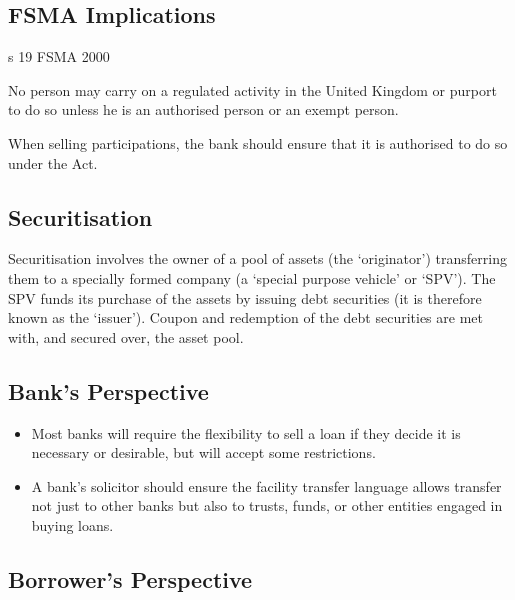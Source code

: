 \documentclass[
]{article}
\providecommand{\tightlist}{%
  \setlength{\itemsep}{0pt}\setlength{\parskip}{0pt}}
\newenvironment{env-794f47f9-38df-4a52-b7f1-227d11939e2b}
{
    \savenotes\tcolorbox[blanker,breakable,left=5pt,borderline west={2pt}{-4pt}{green}]
}
{
    \endtcolorbox\spewnotes
}
\begin{document}
\hypertarget{fsma-implications}{%
\subsection{FSMA Implications}\label{fsma-implications}}

\begin{env-794f47f9-38df-4a52-b7f1-227d11939e2b}

s 19 FSMA 2000

No person may carry on a regulated activity in the United Kingdom or
purport to do so unless he is an authorised person or an exempt person.

\end{env-794f47f9-38df-4a52-b7f1-227d11939e2b}

When selling participations, the bank should ensure that it is
authorised to do so under the Act.

\hypertarget{securitisation}{%
\subsection{Securitisation}\label{securitisation}}

Securitisation involves the owner of a pool of assets (the `originator')
transferring them to a specially formed company (a `special purpose
vehicle' or `SPV'). The SPV funds its purchase of the assets by issuing
debt securities (it is therefore known as the `issuer'). Coupon and
redemption of the debt securities are met with, and secured over, the
asset pool.

\hypertarget{banks-perspective-3}{%
\subsection{Bank's Perspective}\label{banks-perspective-3}}

\begin{itemize}
\tightlist
\item
  Most banks will require the flexibility to sell a loan if they decide
  it is necessary or desirable, but will accept some restrictions.
\item
  A bank's solicitor should ensure the facility transfer language allows
  transfer not just to other banks but also to trusts, funds, or other
  entities engaged in buying loans.
\end{itemize}

\hypertarget{borrowers-perspective-3}{%
\subsection{Borrower's Perspective}\label{borrowers-perspective-3}}
\end{document}
